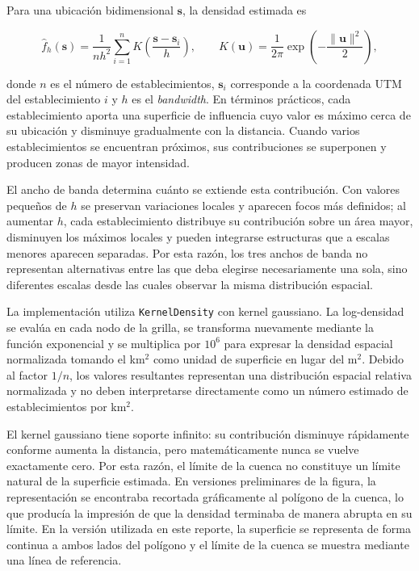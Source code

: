 \documentclass[11pt,letterpaper]{article}
\begin{document}
Para una ubicación bidimensional $\mathbf{s}$, la densidad estimada es

\[
\widehat f_h(\mathbf{s})=
\frac{1}{n h^2}\sum_{i=1}^{n}
K\left(\frac{\mathbf{s}-\mathbf{s}_i}{h}\right),
\qquad
K(\mathbf{u})=
\frac{1}{2\pi}
\exp\left(-\frac{\lVert\mathbf{u}\rVert^2}{2}\right),
\]

donde $n$ es el número de establecimientos, $\mathbf{s}_i$ corresponde a la coordenada UTM del establecimiento $i$ y $h$ es el \emph{bandwidth}. En términos prácticos, cada establecimiento aporta una superficie de influencia cuyo valor es máximo cerca de su ubicación y disminuye gradualmente con la distancia. Cuando varios establecimientos se encuentran próximos, sus contribuciones se superponen y producen zonas de mayor intensidad.

El ancho de banda determina cuánto se extiende esta contribución. Con valores pequeños de $h$ se preservan variaciones locales y aparecen focos más definidos; al aumentar $h$, cada establecimiento distribuye su contribución sobre un área mayor, disminuyen los máximos locales y pueden integrarse estructuras que a escalas menores aparecen separadas. Por esta razón, los tres anchos de banda no representan alternativas entre las que deba elegirse necesariamente una sola, sino diferentes escalas desde las cuales observar la misma distribución espacial.

La implementación utiliza \texttt{KernelDensity} con kernel gaussiano. La log-densidad se evalúa en cada nodo de la grilla, se transforma nuevamente mediante la función exponencial y se multiplica por $10^6$ para expresar la densidad espacial normalizada tomando el km$^2$ como unidad de superficie en lugar del m$^2$. Debido al factor $1/n$, los valores resultantes representan una distribución espacial relativa normalizada y no deben interpretarse directamente como un número estimado de establecimientos por km$^2$.

El kernel gaussiano tiene soporte infinito: su contribución disminuye rápidamente conforme aumenta la distancia, pero matemáticamente nunca se vuelve exactamente cero. Por esta razón, el límite de la cuenca no constituye un límite natural de la superficie estimada. En versiones preliminares de la figura, la representación se encontraba recortada gráficamente al polígono de la cuenca, lo que producía la impresión de que la densidad terminaba de manera abrupta en su límite. En la versión utilizada en este reporte, la superficie se representa de forma continua a ambos lados del polígono y el límite de la cuenca se muestra mediante una línea de referencia.
\end{document}
